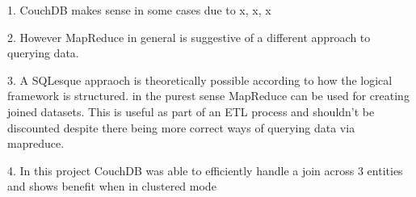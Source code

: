 1. CouchDB makes sense in some cases due to x, x, x

2. However MapReduce in general is suggestive of a different approach to querying data.

3. A SQLesque appraoch is theoretically possible according to how the logical framework is structured. in the purest sense MapReduce can be used for creating joined datasets. This is useful as part of an ETL process and shouldn't be discounted despite there being more correct ways of querying data via mapreduce.

4. In this project CouchDB was able to efficiently handle a join across 3 entities and shows benefit when in clustered mode